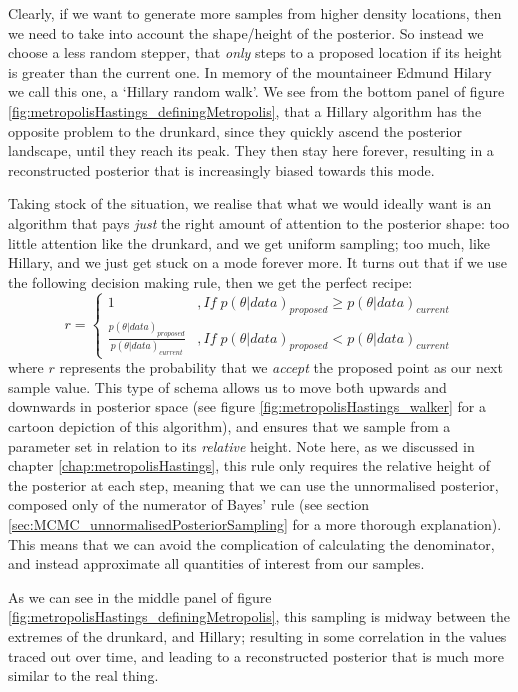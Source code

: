 \documentclass[11pt,fullpage]{book}
\begin{document}
Clearly, if we want to generate more samples from higher density locations, then we need to take into account the shape/height of the posterior. So instead we choose a less random stepper, that \textit{only} steps to a proposed location if its height is greater than the current one. In memory of the mountaineer Edmund Hilary we call this one, a `Hillary random walk'. We see from the bottom panel of figure \ref{fig:metropolisHastings_definingMetropolis}, that a Hillary algorithm has the opposite problem to the drunkard, since they quickly ascend the posterior landscape, until they reach its peak. They then stay here forever, resulting in a reconstructed posterior that is increasingly biased towards this mode.

Taking stock of the situation, we realise that what we would ideally want is an algorithm that pays \textit{just} the right amount of attention to the posterior shape: too little attention like the drunkard, and we get uniform sampling; too much, like Hillary, and we just get stuck on a mode forever more. It turns out that if we use the following decision making rule, then we get the perfect recipe:
%
\begin{equation}
r =
\begin{cases}
1 & , If\; p(\theta|data)_{proposed} \geq p(\theta|data)_{current}\\
 \frac{p(\theta|data)_{proposed}}{p(\theta|data)_{current}}& , If\; p(\theta|data)_{proposed} < p(\theta|data)_{current}
\end{cases}
\end{equation}
%
where $r$ represents the probability that we \textit{accept} the proposed point as our next sample value. This type of schema allows us to move both upwards and downwards in posterior space (see figure \ref{fig:metropolisHastings_walker} for a cartoon depiction of this algorithm), and ensures that we sample from a parameter set in relation to its \textit{relative} height. Note here, as we discussed in chapter \ref{chap:metropolisHastings}, this rule only requires the relative height of the posterior at each step, meaning that we can use the unnormalised posterior, composed only of the numerator of Bayes' rule (see section \ref{sec:MCMC_unnormalisedPosteriorSampling} for a more thorough explanation). This means that we can avoid the complication of calculating the denominator, and instead approximate all quantities of interest from our samples.

As we can see in the middle panel of figure \ref{fig:metropolisHastings_definingMetropolis}, this sampling is midway between the extremes of the drunkard, and Hillary; resulting in some correlation in the values traced out over time, and leading to a reconstructed posterior that is much more similar to the real thing. 
\end{document}
